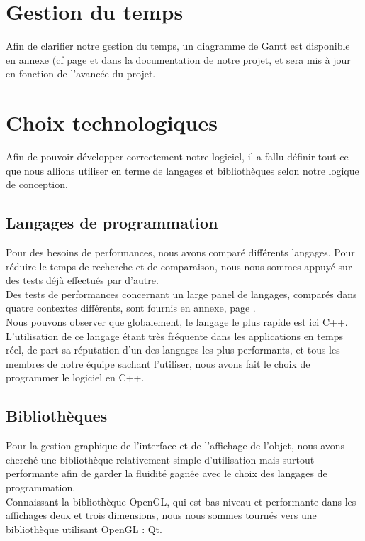 \documentclass[a4paper]{memoir}
\begin{document}
		\section{Gestion du temps}
			\label{GestionTps}
			Afin de clarifier notre gestion du temps, un diagramme de Gantt est disponible en annexe (cf page \pageref{fig:Gantt} et dans la documentation de notre projet, et sera mis à jour en fonction de l'avancée du projet.\\

		\section{Choix technologiques}
			Afin de pouvoir développer correctement notre logiciel, il a fallu définir tout ce que nous allions utiliser en terme de langages et bibliothèques selon notre logique de conception.
			
			\subsection{Langages de programmation}
				Pour des besoins de performances, nous avons comparé différents langages. Pour réduire le temps de recherche et de comparaison, nous nous sommes appuyé sur des tests déjà effectués par d'autre.\\
				Des tests de performances concernant un large panel de langages, comparés dans quatre contextes différents, sont fournis en annexe, page \pageref{fig:analyse}.\\
				Nous pouvons observer que globalement, le langage le plus rapide est ici C++. L'utilisation de ce langage étant très fréquente dans les applications en temps réel, de part sa réputation d'un des langages les plus performants, et tous les membres de notre équipe sachant l'utiliser, nous avons fait le choix de programmer le logiciel en C++.\\

			\subsection{Bibliothèques}
				Pour la gestion graphique de l'interface et de l'affichage de l'objet, nous avons cherché une bibliothèque relativement simple d'utilisation mais surtout performante afin de garder la fluidité gagnée avec le choix des langages de programmation.\\
				Connaissant la bibliothèque OpenGL, qui est bas niveau et performante dans les affichages deux et trois dimensions, nous nous sommes tournés vers une bibliothèque utilisant OpenGL : Qt.\\
\end{document}
